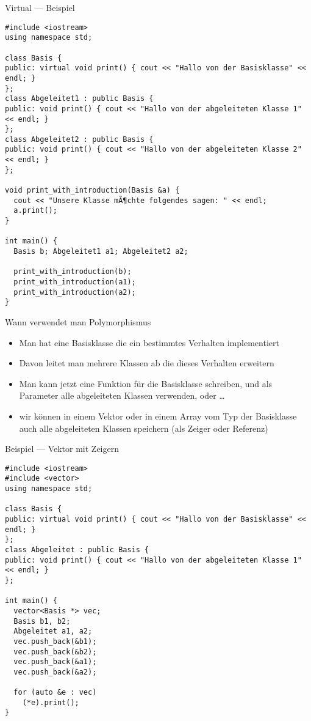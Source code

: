 \documentclass[presentation]{beamer}
\begin{document}
\begin{frame}[label={sec:org15c495a},fragile]{Virtual --- Beispiel}
 \begin{verbatim}
#include <iostream>
using namespace std;

class Basis {
public: virtual void print() { cout << "Hallo von der Basisklasse" << endl; }
};
class Abgeleitet1 : public Basis {
public: void print() { cout << "Hallo von der abgeleiteten Klasse 1" << endl; }
};
class Abgeleitet2 : public Basis {
public: void print() { cout << "Hallo von der abgeleiteten Klasse 2" << endl; }
};

void print_with_introduction(Basis &a) {
  cout << "Unsere Klasse mÃ¶chte folgendes sagen: " << endl;
  a.print();
}

int main() {
  Basis b; Abgeleitet1 a1; Abgeleitet2 a2;

  print_with_introduction(b);
  print_with_introduction(a1);
  print_with_introduction(a2);
}
\end{verbatim}
\end{frame}
\begin{frame}[label={sec:org22cb5c1}]{Wann verwendet man Polymorphismus}
\begin{itemize}
\item Man hat eine Basisklasse die ein bestimmtes Verhalten implementiert
\item Davon leitet man mehrere Klassen ab die dieses Verhalten erweitern
\item Man kann jetzt eine Funktion für die Basisklasse schreiben, und als
Parameter alle abgeleiteten Klassen verwenden, oder \ldots{}
\item wir können in einem Vektor oder in einem Array vom Typ der
Basisklasse auch alle abgeleiteten Klassen speichern (als Zeiger
oder Referenz)
\end{itemize}
\end{frame}
\begin{frame}[label={sec:orgfcbdd6b},fragile]{Beispiel --- Vektor mit Zeigern}
 \begin{verbatim}
#include <iostream>
#include <vector>
using namespace std;

class Basis {
public: virtual void print() { cout << "Hallo von der Basisklasse" << endl; }
};
class Abgeleitet : public Basis {
public: void print() { cout << "Hallo von der abgeleiteten Klasse 1" << endl; }
};

int main() {
  vector<Basis *> vec;
  Basis b1, b2;
  Abgeleitet a1, a2;
  vec.push_back(&b1);
  vec.push_back(&b2);
  vec.push_back(&a1);
  vec.push_back(&a2);

  for (auto &e : vec)
    (*e).print();
}
\end{verbatim}
\end{frame}
\end{document}
